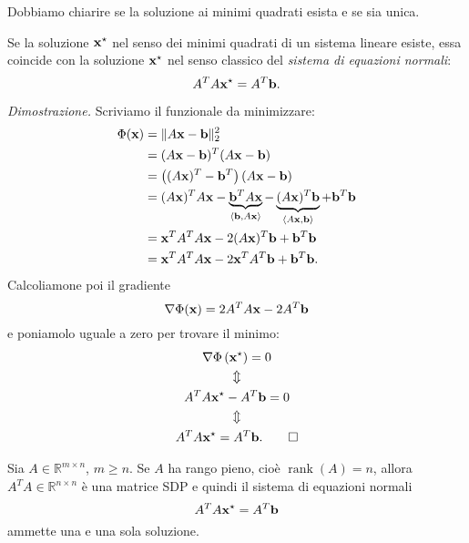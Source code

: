 Dobbiamo chiarire se la soluzione ai minimi quadrati esista e se sia unica.
\begin{lemma}
Se la soluzione $\mathbf{x}^{\star }$ nel senso dei minimi quadrati di un sistema lineare esiste, essa coincide con la soluzione $\mathbf{x}^{\star }$ nel senso classico del \textit{sistema di equazioni normali}:
\begin{equation*}
A^{T} A\mathbf{x}^{\star } =A^{T}\mathbf{b}.
\end{equation*}
\end{lemma}
\textit{Dimostrazione.}
Scriviamo il funzionale da minimizzare:
\begin{align*}
\Phi (\mathbf{x}) & =\Vert A\mathbf{x} -\mathbf{b}\Vert ^{2}_{2}\\
 & =( A\mathbf{x} -\mathbf{b})^{T}( A\mathbf{x} -\mathbf{b})\\
 & =\left(( A\mathbf{x})^{T} -\mathbf{b}^{T}\right)( A\mathbf{x} -\mathbf{b})\\
 & =( A\mathbf{x})^{T} A\mathbf{x}-\underbrace{\mathbf{b}^{T}A\mathbf{x}}_{\langle \mathbf{b} ,A\mathbf{x} \rangle } -\underbrace{( A\mathbf{x})^{T}\mathbf{b}}_{\langle A\mathbf{x} ,\mathbf{b} \rangle } +\mathbf{b}^{T}\mathbf{b}\\
 & =\mathbf{x}^{T} A^{T} A\mathbf{x} -2( A\mathbf{x})^{T}\mathbf{b} +\mathbf{b}^{T}\mathbf{b}\\
 & =\mathbf{x}^{T} A^{T} A\mathbf{x} -2\mathbf{x}^{T} A^{T}\mathbf{b} +\mathbf{b}^{T}\mathbf{b}.
\end{align*}
Calcoliamone poi il gradiente
\begin{equation*}
\nabla \Phi (\mathbf{x}) =2A^{T} A\mathbf{x} -2A^{T}\mathbf{b}
\end{equation*}
e poniamolo uguale a zero per trovare il minimo:
\begin{gather*}
\nabla \Phi \left(\mathbf{x}^{\star }\right) =0\\
\Updownarrow \\
A^{T} A\mathbf{x}^{\star } -A^{T}\mathbf{b} =0\\
\Updownarrow \\
A^{T} A\mathbf{x}^{\star } =A^{T}\mathbf{b}.
\qed
\end{gather*}

\begin{theorem}
Sia $A\in \mathbb{R}^{m\times n}$, $m\geqslant n$.
Se $A$ ha rango pieno, cioè $\operatorname{rank}(A) =n$, allora $A^{T} A\in \mathbb{R}^{n\times n}$ è una matrice SDP e quindi il sistema di equazioni normali
\begin{equation*}
A^{T} A\mathbf{x}^{\star } =A^{T}\mathbf{b}
\end{equation*}
ammette una e una sola soluzione.
\end{theorem}

